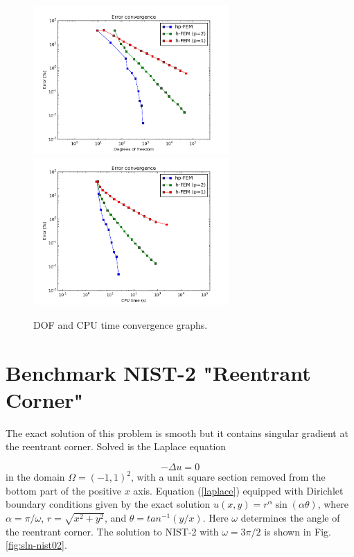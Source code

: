 \documentclass[12pt]{elsarticle}
\begin{document}
\begin{figure}[H]
\centering
\vspace{-3mm}
\hspace{-50mm}
\includegraphics[width=7.5cm]{nist/nist-1/conv_dof_aniso.png}\ \
\hspace{-8mm}
\includegraphics[width=7.5cm]{nist/nist-1/conv_cpu_aniso.png}
\hspace{-50mm}
\vspace{-2mm}
\caption{DOF and CPU time convergence graphs.}
\vspace{-5mm}
\label{fig:nist-1-conv}
\end{figure}


\section{Benchmark NIST-2 "Reentrant Corner"}
\label{sec:bench-2}

The exact solution of this problem is smooth but it contains
singular gradient at the reentrant corner.
Solved is the Laplace equation

\begin{equation} \label{laplace}
-\Delta u = 0
\end{equation}
in the domain $\Omega = (-1, 1)^2$, with a unit square
section removed from the bottom part of the positive $x$ axis.
Equation (\ref{laplace}) equipped with Dirichlet
boundary conditions given by the exact solution
$u(x, y) = r^{\alpha}\sin(\alpha \theta)$,
where $\alpha = \pi / \omega$, $r = \sqrt{x^2+y^2}$,
and $\theta = tan^{-1}(y/x)$. Here $\omega $ determines
the angle of the reentrant corner.
The solution to NIST-2 with $\omega = 3 \pi / 2$
is shown in Fig. \ref{fig:sln-nist02}.
\end{document}

